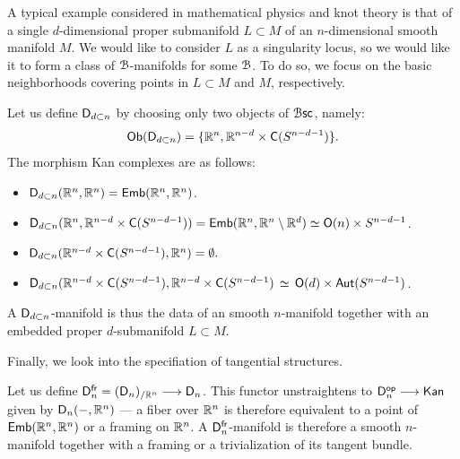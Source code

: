 \begin{example}
    A typical example considered in mathematical physics and knot theory is that of a single $d$-dimensional proper submanifold $L\subset M$ of an $n$-dimensional smooth manifold $M$. We would like to consider $L$ as a singularity locus, so we would like it to form a class of $\mathcal B$-manifolds for some $\mathcal B$. To do so, we focus on the basic neighborhoods covering points in $L\subset M$ and $M$, respectively. 
    
    Let us define $\mathsf D_{d\subset n}$ by choosing only two objects of $\operatorname{\mathcal B\mathsf{sc}}$, namely:
    \begin{equation}
        \mathsf{Ob}(\mathsf D_{d\subset n}) = \{\mathbb R^{n}, \mathbb R^{n-d}\times \mathsf C(S^{n-d-1})\}.
    \end{equation}
    The morphism Kan complexes are as follows:
    \begin{itemize}
        \item $\mathsf D_{d\subset n}(\mathbb R^{n},\mathbb R^{n}) = \mathsf{Emb}(\mathbb R^{n},\mathbb R^{n})$.
        \item $\mathsf D_{d\subset n}(\mathbb R^{n},\mathbb R^{n-d}\times \mathsf C(S^{n-d-1})) = \mathsf{Emb}(\mathbb R^{n},\mathbb R^{n}\setminus \mathbb R^{d}) \simeq \mathsf O(n) \times S^{n-d-1}$.
        \item $\mathsf D_{d\subset n}(\mathbb R^{n-d}\times \mathsf C(S^{n-d-1}),\mathbb R^{n}) = \emptyset.$
        \item $\mathsf D_{d\subset n}(\mathbb R^{n-d}\times \mathsf C(S^{n-d-1}),\mathbb R^{n-d}\times \mathsf C(S^{n-d-1}) \, \simeq \, \mathsf O(d) \times \operatorname{\sf Aut}(S^{n-d-1})$.
    \end{itemize}
    A $\mathsf D_{d\subset n}$-manifold is thus the data of an smooth $n$-manifold together with an embedded proper $d$-submanifold $L \subset M$. 
\end{example}

Finally, we look into the specifiation of tangential structures. 

\begin{example}
Let us define $\mathsf D_{n}^{\operatorname{\sf fr}} = (\mathsf D_{n})_{/\mathbb R^{n}} \longrightarrow \mathsf D_{n}$. This functor unstraightens to $\mathsf D_{n}^{\mathsf{op}} \longrightarrow \mathsf{Kan}$ given by $\mathsf D_{n}(-,\mathbb R^{n})$ — a fiber over $\mathbb R^{n}$ is therefore equivalent to a point of $\mathsf{Emb}(\mathbb R^n, \mathbb R^n)$ or a framing on $\mathbb R^{n}$. A $\mathsf D_n^{\sf fr}$-manifold is therefore a smooth $n$-manifold together with a framing or a trivialization of its tangent bundle. 
\end{example}

